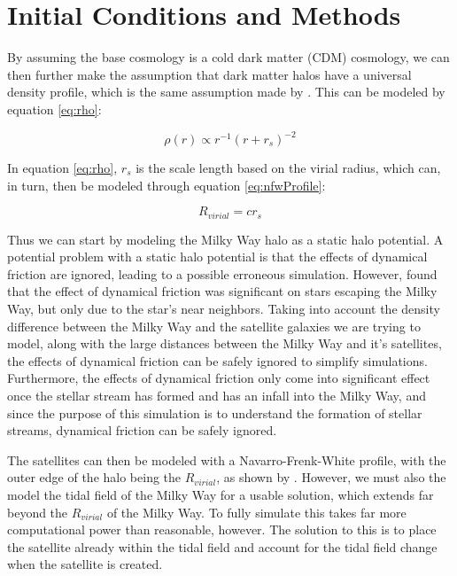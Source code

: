 \documentclass[twocolumn]{article}
\begin{document}
\section{Initial Conditions and Methods}
By assuming the base cosmology is a cold dark matter (CDM) cosmology, we can then further make the assumption that dark matter halos have a universal density profile, which is the same assumption made by \cite{dynamicsOfTidalTails}. This can be modeled by equation \ref{eq:rho}:

\begin{equation}
\rho(r) \propto r^{-1}(r+r_s)^{-2}
\label{eq:rho}
\end{equation}  

In equation \ref{eq:rho}, $r_s$ is the scale length based on the virial radius, which can, in turn, then be modeled through equation \ref{eq:nfwProfile}:

\begin{equation}
	R_{virial} = cr_s
	\label{eq:nfwProfile}
\end{equation}

Thus we can start by modeling the Milky Way halo as a static halo potential. A potential problem with a static halo potential is that the effects of dynamical friction are ignored, leading to a possible erroneous simulation. However, \cite{dynamicalFriction} found that the effect of dynamical friction was significant on stars escaping the Milky Way, but only due to the star's near neighbors. Taking into account the density difference between the Milky Way and the satellite galaxies we are trying to model, along with the large distances between the Milky Way and it's satellites, the effects of dynamical friction can be safely ignored to simplify simulations. Furthermore, the effects of dynamical friction only come into significant effect once the stellar stream has formed and has an infall into the Milky Way, and since the purpose of this simulation is to understand the formation of stellar streams, dynamical friction can be safely ignored. 

The satellites can then be modeled with a Navarro-Frenk-White profile, with the outer edge of the halo being the $R_{virial}$, as shown by \cite{bryanNorman}. However, we must also the model the tidal field of the Milky Way for a usable solution, which extends far beyond the $R_{virial}$ of the Milky Way. To fully simulate this takes far more computational power than reasonable, however. The solution to this is to place the satellite already within the tidal field and account for the tidal field change when the satellite is created. 
\end{document}

